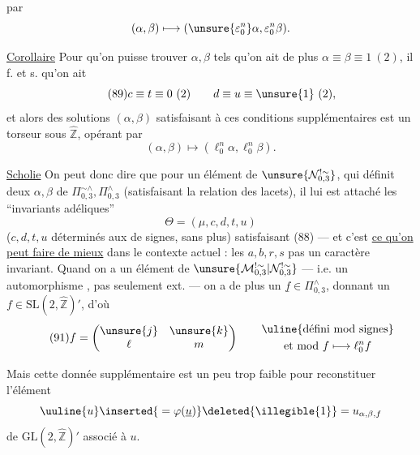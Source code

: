 

par
\[
 (\alpha,\beta)\longmapsto
 (\unsure{\varepsilon_0^n}\alpha,\varepsilon_0^n\beta).
\]

\uline{Corollaire} Pour qu'on puisse trouver $\alpha,\beta$ tels qu'on ait de plus $\alpha\equiv\beta\equiv1\ (2)$, il f. et s. qu'on ait
\[
\tag{89}
 c\equiv t\equiv0\ (2)\qquad d\equiv u\equiv\unsure{1}\ (2),
\]
et alors  des solutions $(\alpha,\beta)$ satisfaisant à ces conditions supplémentaires est un torseur sous $\widehat{\mathbb Z}$, opérant par
\[
 (\alpha,\beta)\longmapsto(\ell_0^n\alpha,\ell_0^n\beta).
\]

\uline{Scholie} On peut donc dire que pour un élément  de $\unsure{\mathcal N_{0,3}^{!\sim}}$, qui définit deux $\alpha,\beta$ de $\Pi_{0,3}^{\sim\wedge},\Pi_{0,3}^{\wedge}$  (satisfaisant la relation des lacets), il lui est attaché les ``invariants adéliques'' 
\[
\tag{90}
 \Theta=(\mu,c,d,t,u)
\]
($c,d,t,u$ déterminés aux  de signes, sans plus) satisfaisant (88) --- et c'est \uline{ce qu'on peut faire de mieux} dans le contexte actuel : les $a,b,r,s$  pas un caractère invariant. Quand on a un élément  de $\unsure{\mathcal M_{0,3}^{!\sim}|\mathcal N_{0,3}^{!\sim}}$ --- i.e. un automorphisme , pas seulement ext. --- on a de plus un $\underline f\in\Pi_{0,3}^{\wedge}$, donnant un $f\in\mathrm{SL}(2,\widehat{\mathbb Z})'$, d'où
\[
\tag{91}
 f=\begin{pmatrix}\unsure{j}&\unsure{k}\\ \ell&m\end{pmatrix}
 \qquad\begin{gathered}\uline{\text{défini mod signes}}\\
 \text{et mod } f\longmapsto\ell_0^n f
 \end{gathered}
\]



Mais cette donnée supplémentaire est un peu trop
faible pour reconstituer  l'élément
\[
 \uuline{u}\inserted{{}=\varphi(\underline u)}\deleted{\illegible{1}}
 =u_{\alpha,\beta,f}
\]
de $\mathrm{GL}(2,\widehat{\mathbb Z})'$ associé à $u$.

